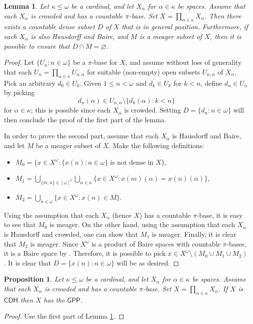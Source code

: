 \documentclass{amsart}
\theoremstyle{plain}
\newtheorem{lemma}[theorem]{Lemma}
\newtheorem{proposition}[theorem]{Proposition}
\theoremstyle{definition}
\newcommand{\CDH}{\mathsf{CDH}}
\newcommand{\GPP}{\mathsf{GPP}}
\begin{document}
\begin{lemma}\label{lemma_exists_gp}
Let $\kappa\leq\omega$ be a cardinal, and let $X_\alpha$ for $\alpha\in\kappa$ be spaces. Assume that each $X_\alpha$ is crowded and has a countable $\pi$-base. Set $X=\prod_{\alpha\in\kappa}X_\alpha$. Then there exists a countable dense subset $D$ of $X$ that is in general position. Furthermore, if each $X_\alpha$ is also Hausdorff and Baire, and $M$ is a meager subset of $X$, then it is possible to ensure that $D\cap M=\varnothing$.
\end{lemma}
\begin{proof}
Let $\{U_n:n\in\omega\}$ be a $\pi$-base for $X$, and assume without loss of generality that each $U_n=\prod_{\alpha\in\kappa}U_{n,\alpha}$ for suitable (non-empty) open subsets $U_{n,\alpha}$ of $X_\alpha$. Pick an arbitrary $d_0\in U_0$. Given $1\leq n<\omega$ and $d_k\in U_k$ for $k<n$, define $d_n\in U_n$ by picking
$$
d_n(\alpha)\in U_{n,\alpha}\setminus\{d_k(\alpha):k<n\}
$$
for $\alpha\in\kappa$; this is possible since each $X_\alpha$ is crowded. Setting $D=\{d_n:n\in\omega\}$ will then conclude the proof of the first part of the lemma.

In order to prove the second part, assume that each $X_\alpha$ is Hausdorff and Baire, and let $M$ be a meager subset of $X$. Make the following definitions:
\begin{itemize}
\item $M_0=\{x\in X^\omega:\{x(n):n\in\omega\}\text{ is not dense in }X\}$,
\item $M_1=\bigcup_{\{m,n\}\in [\omega]^2}\bigcup_{\alpha\in\kappa}\{x\in X^\omega:x(m)(\alpha)=x(n)(\alpha)\}$,
\item $M_2=\bigcup_{n\in\omega}\{x\in X^\omega:x(n)\in M\}$.
\end{itemize}
Using the assumption that each $X_\alpha$ (hence $X$) has a countable $\pi$-base, it is easy to see that $M_0$ is meager. On the other hand, using the assumption that each $X_\alpha$ is Hausdorff and crowded, one can show that $M_1$ is meager. Finally, it is clear that $M_2$ is meager. Since $X^\omega$ is a product of Baire spaces with countable $\pi$-bases, it is a Baire space by \cite[Theorem 3]{oxtoby}. Therefore, it is possible to pick $x\in X^\omega\setminus (M_0\cup M_1\cup M_2)$. It is clear that $D=\{x(n):n\in\omega\}$ will be as desired.
\end{proof}

\begin{proposition}\label{proposition_cdh_implies_gpp}
Let $\kappa\leq\omega$ be a cardinal, and let $X_\alpha$ for $\alpha\in\kappa$ be spaces. Assume that each $X_\alpha$ is crowded and has a countable $\pi$-base. Set $X=\prod_{\alpha\in\kappa}X_\alpha$. If $X$ is $\CDH$ then $X$ has the $\GPP$.
\end{proposition}
\begin{proof}
Use the first part of Lemma \ref{lemma_exists_gp}.
\end{proof}
\end{document}
